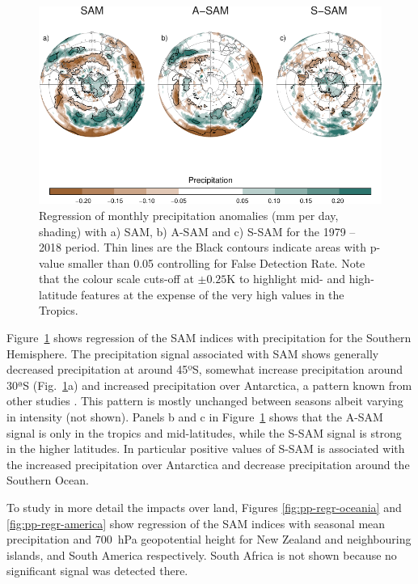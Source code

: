 \documentclass[smallextended]{svjour3}       %
\begin{document}
\begin{figure}
\includegraphics{global-pp-1} \caption{Regression of monthly precipitation anomalies (mm per day, shading) with a) SAM, b) A\nobreakdash-SAM and c) S\nobreakdash-SAM for the 1979 -- 2018 period. Thin lines are the Black contours indicate areas with p-value smaller than 0.05 controlling for False Detection Rate. Note that the colour scale cuts-off at \(\pm0.25 \mathrm{K}\) to highlight mid- and high-latitude features at the expense of the very high values in the Tropics.}\label{fig:global-pp}
\end{figure}

Figure~\ref{fig:global-pp} shows regression of the SAM indices with precipitation for the Southern Hemisphere. The precipitation signal associated with SAM shows generally decreased precipitation at around 45ºS, somewhat increase precipitation around 30ªS (Fig.~\ref{fig:global-pp}a) and increased precipitation over Antarctica, a pattern known from other studies \citep[e.g.][]{hendon2014}.
This pattern is mostly unchanged between seasons albeit varying in intensity (not shown).
Panels b and c in Figure~\ref{fig:global-pp} shows that the A\nobreakdash-SAM signal is only in the tropics and mid-latitudes, while the S\nobreakdash-SAM signal is strong in the higher latitudes.
In particular positive values of S\nobreakdash-SAM is associated with the increased precipitation over Antarctica and decrease precipitation around the Southern Ocean.

To study in more detail the impacts over land, Figures \ref{fig:pp-regr-oceania} and \ref{fig:pp-regr-america} show regression of the SAM indices with seasonal mean precipitation and 700~hPa geopotential height for New Zealand and neighbouring islands, and South America respectively.
South Africa is not shown because no significant signal was detected there.
\end{document}
